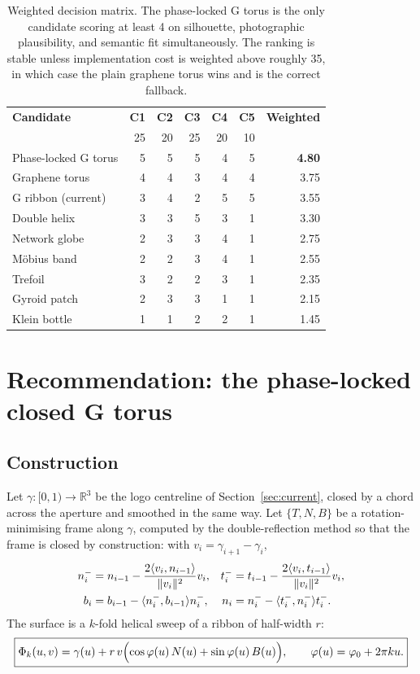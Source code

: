 \documentclass[11pt,a4paper]{article}
\theoremstyle{definition}
\begin{document}
\begin{table}[htbp]
\centering
\begin{tabular}{@{}lrrrrr r@{}}
\toprule
\textbf{Candidate} & \textbf{C1} & \textbf{C2} & \textbf{C3} & \textbf{C4} & \textbf{C5} & \textbf{Weighted} \\
 & 25 & 20 & 25 & 20 & 10 & \\
\midrule
Phase-locked G torus & 5 & 5 & 5 & 4 & 5 & \textbf{4.80} \\
Graphene torus & 4 & 4 & 3 & 4 & 4 & 3.75 \\
G ribbon (current) & 3 & 4 & 2 & 5 & 5 & 3.55 \\
Double helix & 3 & 3 & 5 & 3 & 1 & 3.30 \\
Network globe & 2 & 3 & 3 & 4 & 1 & 2.75 \\
M\"obius band & 2 & 2 & 3 & 4 & 1 & 2.55 \\
Trefoil & 3 & 2 & 2 & 3 & 1 & 2.35 \\
Gyroid patch & 2 & 3 & 3 & 1 & 1 & 2.15 \\
Klein bottle & 1 & 1 & 2 & 2 & 1 & 1.45 \\
\bottomrule
\end{tabular}
\caption{Weighted decision matrix. The phase-locked G torus is the only
candidate scoring at least 4 on silhouette, photographic plausibility, and
semantic fit simultaneously. The ranking is stable unless implementation cost
is weighted above roughly 35, in which case the plain graphene torus wins and
is the correct fallback.}
\label{tab:matrix}
\end{table}

\section{Recommendation: the phase-locked closed G torus}
\label{sec:recommendation}

\subsection{Construction}

Let $\gamma:[0,1)\to\mathbb{R}^3$ be the logo centreline of
Section~\ref{sec:current}, closed by a chord across the aperture and smoothed
in the same way. Let $\{T,N,B\}$ be a rotation-minimising frame along
$\gamma$, computed by the double-reflection method so that the frame is closed
by construction: with $v_i=\gamma_{i+1}-\gamma_i$,
\begin{align}
n_i^-&=n_{i-1}-\frac{2\langle v_i,n_{i-1}\rangle}{\lVert v_i\rVert^2}v_i,
&
t_i^-&=t_{i-1}-\frac{2\langle v_i,t_{i-1}\rangle}{\lVert v_i\rVert^2}v_i, \label{eq:dr}\\
b_i&=b_{i-1}-\langle n_i^-,b_{i-1}\rangle n_i^-,
&
n_i&=n_i^--\langle t_i^-,n_i^-\rangle t_i^- . \notag
\end{align}
The surface is a $k$-fold helical sweep of a ribbon of half-width $r$:
\begin{equation}
\label{eq:helix}
\boxed{
\Phi_k(u,v)=\gamma(u)+r\,v\Bigl(\cos\varphi(u)\,N(u)+\sin\varphi(u)\,B(u)\Bigr),
\qquad
\varphi(u)=\varphi_0+2\pi k u .
}
\end{equation}
\end{document}

